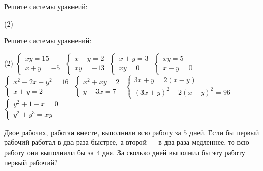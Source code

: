 \begin{class}[number=6]
	\begin{listofex}
		\item Решите системы уравнеий:
		\begin{tasks}(2)
			\task {}
			\task {}
			\task {}
			\task {}
		\end{tasks}
		\item Решите системы уравнений:
		\begin{tasks}(2)
			\task \( \left\{
			\begin{array}{l}
				xy=15\\
				x+y=-5
			\end{array}
			\right. \)
			\task \( \left\{
			\begin{array}{l}
				x-y=2\\
				xy=-13
			\end{array}
			\right. \)
			\task \( \left\{
			\begin{array}{l}
				x+y=3\\
				xy=0
			\end{array}
			\right. \)
			\task \( \left\{
			\begin{array}{l}
				xy=5\\
				x-y=0
			\end{array}
			\right. \)
			\task \( \left\{
			\begin{array}{l}
				x^2+2x+y^2=16\\
				x+y=2
			\end{array}
			\right. \)
			\task \( \left\{
			\begin{array}{l}
				x^2+xy=2\\
				y-3x=7
			\end{array}
			\right. \)
			\task \( \left\{
			\begin{array}{l}
				3x+y=2(x-y)\\
				(3x+y)^2+2(x-y)^2=96
			\end{array}
			\right. \)
			\task \( \left\{
			\begin{array}{l}
				y^2+1-x=0\\
				y^2+y^3=xy
			\end{array}
			\right. \)
		\end{tasks}
		\item Двое рабочих, работая вместе, выполнили всю работу за \(5\)  дней. Если бы первый рабочий работал в два раза быстрее, а второй --- в два раза медленнее, то всю работу они выполнили бы за \(4\) дня. За сколько дней выполнил бы эту работу первый рабочий?

\end{listofex}
\end{class}
